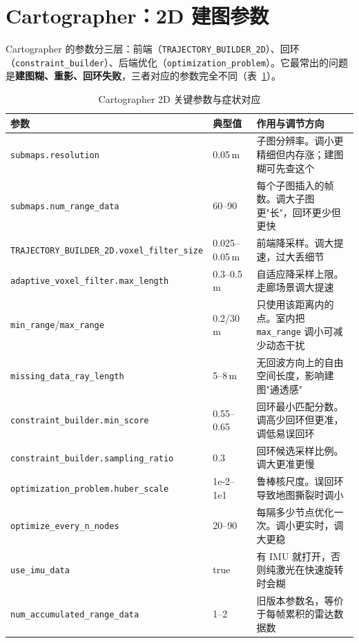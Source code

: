 \section{Cartographer：2D 建图参数}\label{sec:27-carto}

Cartographer 的参数分三层：前端（\lstinline{TRAJECTORY_BUILDER_2D}）、回环（\lstinline{constraint_builder}）、后端优化（\lstinline{optimization_problem}）\cite{hess2016cartographer}。它最常出的问题是\textbf{建图糊、重影、回环失败}，三者对应的参数完全不同（表~\ref{tab:27-carto}）。

\begin{table}[htbp]
  \centering
  \caption{Cartographer 2D 关键参数与症状对应}\label{tab:27-carto}
  \footnotesize
  \begin{tabular}{p{4.2cm}p{1.9cm}p{7.4cm}}
    \toprule
    参数 & 典型值 & 作用与调节方向 \\
    \midrule
    \lstinline{submaps.resolution} & 0.05\,m & 子图分辨率。调小更精细但内存涨；建图糊可先查这个 \\
    \lstinline{submaps.num_range_data} & 60--90 & 每个子图插入的帧数。调大子图更"长"，回环更少但更快 \\
    \lstinline{TRAJECTORY_BUILDER_2D.voxel_filter_size} & 0.025--0.05\,m & 前端降采样。调大提速，过大丢细节 \\
    \lstinline{adaptive_voxel_filter.max_length} & 0.3--0.5\,m & 自适应降采样上限。走廊场景调大提速 \\
    \lstinline{min_range}/\lstinline{max_range} & 0.2/30\,m & 只使用该距离内的点。室内把 \lstinline{max_range} 调小可减少动态干扰 \\
    \lstinline{missing_data_ray_length} & 5--8\,m & 无回波方向上的自由空间长度，影响建图"通透感" \\
    \lstinline{constraint_builder.min_score} & 0.55--0.65 & 回环最小匹配分数。调高少回环但更准，调低易误回环 \\
    \lstinline{constraint_builder.sampling_ratio} & 0.3 & 回环候选采样比例。调大更准更慢 \\
    \lstinline{optimization_problem.huber_scale} & 1e-2--1e1 & 鲁棒核尺度。误回环导致地图撕裂时调小 \\
    \lstinline{optimize_every_n_nodes} & 20--90 & 每隔多少节点优化一次。调小更实时，调大更稳 \\
    \lstinline{use_imu_data} & true & 有 IMU 就打开，否则纯激光在快速旋转时会糊 \\
    \lstinline{num_accumulated_range_data} & 1--2 & 旧版本参数名，等价于每帧累积的雷达数据数 \\
    \bottomrule
  \end{tabular}
\end{table}

